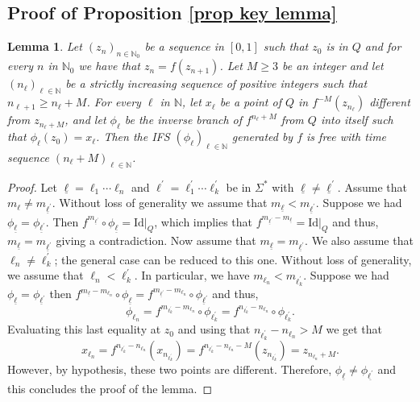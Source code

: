 \documentclass[10pt,a4paper]{amsart}
\numberwithin{equation}{section} %
\numberwithin{figure}{section} %
\newtheorem{lemm}[prop]{Lemma}
\newcommand{\N}{\mathbb{N}}
\renewcommand{\=}{\coloneqq}
\begin{document}
\subsection{Proof of Proposition \ref{prop key lemma}}
    \begin{lemm}\label{lemma A2}
        Let $(z_n)_{n\in\N_0}$ be a sequence in $[0,1]$ such that $z_0$ is in $Q$ and for every $n$ in $\N_0$ we have that $z_n = f(z_{n+1})$. Let $M\geq 3$ be an integer and let $(n_\ell)_{\ell\in \N}$ be a strictly increasing sequence of positive integers such that $n_{\ell+1}\geq n_\ell + M$. For every $\ell$ in $\N$, let $x_\ell$ be a point of $Q$ in $f^{-M}(z_{n_\ell})$ different from $z_{n_\ell + M}$, and let $\phi_\ell$ be the inverse branch of $f^{n_\ell + M}$ from $Q$ into itself such that $\phi_\ell(z_0)=x_\ell$. Then the IFS $(\phi_\ell)_{\ell\in\N}$ generated by $f$ is free with time sequence $(n_\ell + M)_{\ell\in \N}$.
    \end{lemm}
    \begin{proof}
        Let $\underline{\ell}= \ell_1\cdots\ell_n$ and $\ell^{'}= \ell_1^{'}\cdots \ell_k^{'}$ be in $\Sigma^*$ with $\underline{\ell}\neq \underline{\ell}^{'}$. Assume that $m_{\ell} \neq m_{\underline{\ell}^{'}}$. Without loss of generality we assume that $m_{\underline{\ell}}<m_{\underline{\ell}^{'}}$. Suppose we had $\phi_{\underline{\ell}}=\phi_{\underline{\ell}^{'}}$. Then 
        $f^{m_{\underline{\ell}^{'}}}\circ \phi_{\underline{\ell}}= \text{Id}|_{Q}$, which implies that $f^{m_{\underline{\ell}^{'}}-m_{\underline{\ell}}}= \text{Id}|_{Q}$ and thus, $m_{\underline{\ell}}= m_{\underline{\ell}^{'}}$ giving a contradiction. Now assume that $m_{\underline{\ell}}=m_{\underline{\ell}^{'}}$. We also assume that $\ell_n\neq \ell_k^{'}$; the general case can be reduced to this one. Without loss of generality, we assume that $\ell_n<\ell_k^{'}$. In particular, we have $m_{\ell_n}<m_{\ell_k^{'}}$. Suppose we had $\phi_{\underline{\ell}}= \phi_{\underline{\ell}^{'}}$ then $f^{m_{\underline{\ell}}-m_{\ell_n}}\circ \phi_{\underline{\ell}}= f^{m_{\underline{\ell}^{'}}-m_{\ell_n}}\circ \phi_{\underline{\ell}^{'}}$ and thus,
        \begin{equation*}
            \phi_{\ell_n}= f^{m_{\ell_k^{'}}-m_{\ell_n}}\circ \phi_{\ell_k^{'}}= f^{n_{\ell_k^{'}}-n_{\ell_n}}\circ \phi_{\ell_k^{'}}.
        \end{equation*}
        Evaluating this last equality at $z_0$ and using that $n_{\ell_k^{'}}-n_{\ell_n}>M$ we get that
        \begin{equation*}
            x_{\ell_n}= f^{n_{\ell_k^{'}}-n_{\ell_n}}(x_{n_{\ell_k^{'}}})= f^{n_{\ell_k^{'}}-n_{\ell_n}-M}(z_{n_{\ell_k^{'}}}) = z_{n_{\ell_n}+M}.
        \end{equation*}
        However, by hypothesis, these two points are different. Therefore, $\phi_{\underline{\ell}}\neq \phi_{\underline{\ell^{'}}}$ and this concludes the proof of the lemma.
    \end{proof}
\end{document}

